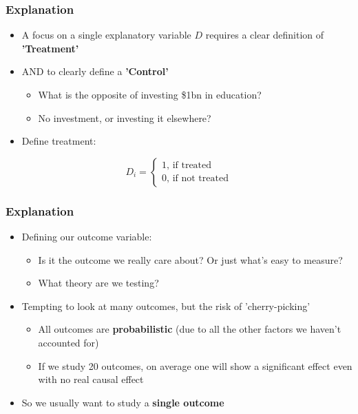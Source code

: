 \documentclass[xcolor=x11names,compress]{beamer}\usepackage[]{graphicx}\usepackage[]{color}
\renewcommand{\(}{\begin{columns}}
\renewcommand{\)}{\end{columns}}
\newcommand{\<}[1]{\begin{column}{#1}}
\renewcommand{\>}{\end{column}}
\begin{document}
\begin{frame}
\frametitle{Explanation}
\begin{itemize}
\item A focus on a single explanatory variable $D$ requires a clear definition of \textbf{'Treatment'}
\pause
\item AND to clearly define a \textbf{'Control'}
\pause
\begin{itemize}
\item What is the opposite of investing \$1bn in education?
\pause
\item No investment, or investing it elsewhere?
\pause
\end{itemize}
\item Define treatment:
\end{itemize}
\[D_i = 
\begin{cases}
1 \text{, if treated} \\
0 \text{, if not treated}
\end{cases}
\]
\end{frame}

\begin{frame}
\frametitle{Explanation}
\begin{itemize}
\item Defining our outcome variable:
\pause
\begin{itemize}
\item Is it the outcome we really care about? Or just what's easy to measure?
\pause
\item What theory are we testing?
\end{itemize}
\pause
\item Tempting to look at many outcomes, but the risk of 'cherry-picking'
\pause
\begin{itemize}
\item All outcomes are \textbf{probabilistic} (due to all the other factors we haven't accounted for)
\pause
\item If we study 20 outcomes, on average one will show a significant effect even with no real causal effect
\pause
\end{itemize}
\item So we usually want to study a \textbf{single outcome}
\end{itemize}
\end{frame}
\end{document}
